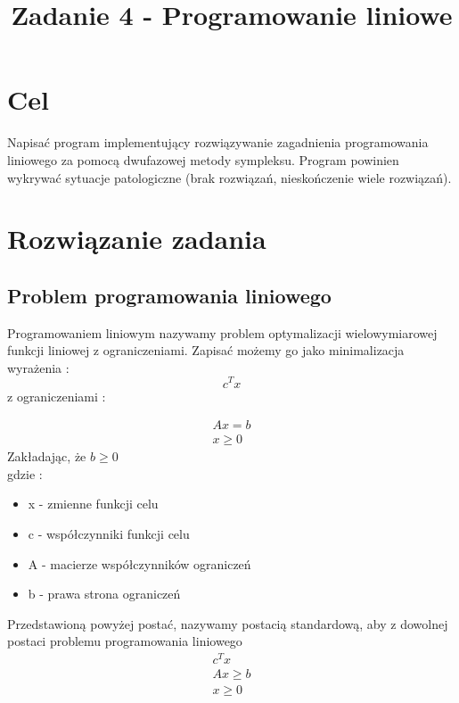 \documentclass{classrep}
\author{
  \studentinfo{Paweł Musiał}{178726} \and
  \studentinfo{Łukasz Michalski}{178724}
}
\title{Zadanie 4 - Programowanie liniowe} %
\begin{document}
\maketitle

\section{Cel}
Napisać program implementujący rozwiązywanie zagadnienia programowania liniowego za pomocą dwufazowej metody sympleksu. Program powinien wykrywać sytuacje patologiczne (brak rozwiązań, nieskończenie wiele rozwiązań).

\section{Rozwiązanie zadania}

\subsection{Problem programowania liniowego}

Programowaniem liniowym nazywamy problem optymalizacji wielowymiarowej funkcji liniowej z ograniczeniami.
Zapisać możemy go jako minimalizacja wyrażenia :
\begin{equation}
c^{T}x
\end{equation}
z ograniczeniami :

\begin{eqnarray}
Ax=b \\
x \geq 0
\end{eqnarray}
Zakładając, że $b \geq 0$\\
gdzie :
\begin{itemize}
\item x - zmienne funkcji celu
\item c - współczynniki funkcji celu
\item A - macierze współczynników ograniczeń
\item b - prawa strona ograniczeń
\end{itemize}

Przedstawioną powyżej postać, nazywamy postacią standardową, aby z dowolnej postaci problemu programowania liniowego
\begin{eqnarray}
c^{T}x\\
Ax \geq b \\
x \geq 0
\end{eqnarray}
\end{document}
